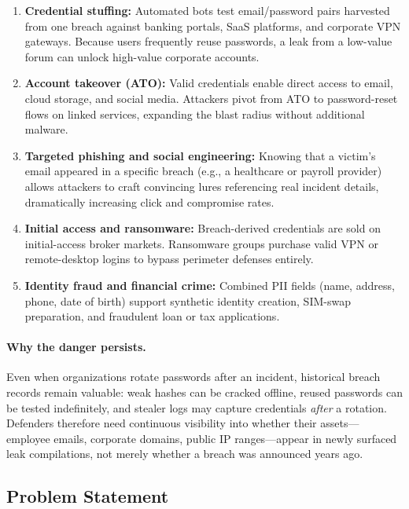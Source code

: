 \begin{enumerate}[nosep]
  \item \textbf{Credential stuffing:} Automated bots test email/password
        pairs harvested from one breach against banking portals, SaaS
        platforms, and corporate VPN gateways. Because users frequently reuse
        passwords, a leak from a low-value forum can unlock high-value
        corporate accounts.
  \item \textbf{Account takeover (ATO):} Valid credentials enable direct
        access to email, cloud storage, and social media. Attackers pivot
        from ATO to password-reset flows on linked services, expanding the
        blast radius without additional malware.
  \item \textbf{Targeted phishing and social engineering:} Knowing that a
        victim's email appeared in a specific breach (e.g., a healthcare or
        payroll provider) allows attackers to craft convincing lures
        referencing real incident details, dramatically increasing click and
        compromise rates.
  \item \textbf{Initial access and ransomware:} Breach-derived credentials
        are sold on initial-access broker markets. Ransomware groups purchase
        valid VPN or remote-desktop logins to bypass perimeter defenses
        entirely.
  \item \textbf{Identity fraud and financial crime:} Combined PII fields
        (name, address, phone, date of birth) support synthetic identity
        creation, SIM-swap preparation, and fraudulent loan or tax
        applications.
\end{enumerate}

\paragraph{Why the danger persists.}
Even when organizations rotate passwords after an incident, historical breach
records remain valuable: weak hashes can be cracked offline, reused passwords
can be tested indefinitely, and stealer logs may capture credentials \emph{after}
a rotation. Defenders therefore need continuous visibility into whether their
assets---employee emails, corporate domains, public IP ranges---appear in
newly surfaced leak compilations, not merely whether a breach was announced
years ago.

\subsection{Problem Statement}
\label{sec:problematic}

